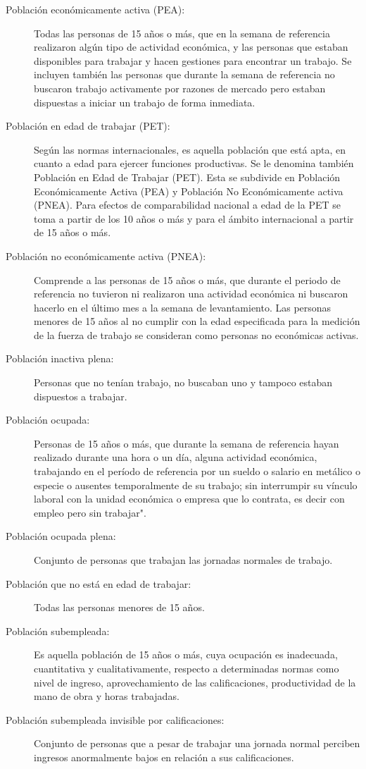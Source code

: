 \begin{description}
	\item[Población económicamente activa (PEA):] Todas las personas de 15 años o más, que en la semana de referencia realizaron algún tipo de actividad económica, y las personas que estaban disponibles para trabajar y hacen gestiones para encontrar un trabajo. Se incluyen también las personas que durante la semana de referencia no buscaron trabajo activamente por razones de mercado pero estaban dispuestas a iniciar un trabajo de forma inmediata.
	
	\item[Población en edad de trabajar (PET):] Según las normas internacionales, es aquella población que está apta, en cuanto a edad para ejercer funciones productivas. Se le denomina también Población en Edad de Trabajar (PET). Esta se subdivide en Población Económicamente Activa (PEA) y Población No Económicamente activa (PNEA). Para efectos de comparabilidad nacional a edad de la PET se toma a partir de los 10 años o más y para el ámbito internacional a partir de 15 años o más.
	\item[Población no económicamente activa (PNEA):] Comprende a las personas de 15 años o más, que durante el periodo de referencia no tuvieron ni realizaron una actividad económica ni buscaron hacerlo en el último mes a la semana de levantamiento. Las personas menores de 15 años al no cumplir con la edad especificada para la medición de la fuerza de trabajo se consideran como personas no económicas activas.
	\item[Población inactiva plena:] Personas que no tenían trabajo, no buscaban uno y tampoco estaban dispuestos a trabajar.
	
	\item[Población ocupada:] Personas de 15 años o más, que durante la semana de referencia hayan realizado durante una hora o un día, alguna actividad económica, trabajando en el período de referencia por un sueldo o salario en metálico o especie o ausentes temporalmente de su trabajo; sin interrumpir su vínculo laboral con la unidad económica o empresa que lo contrata, es decir con empleo pero sin trabajar".
	\item[Población ocupada plena:] Conjunto de personas que trabajan las jornadas normales de trabajo.
	
	\item[Población que no está en edad de trabajar:] Todas las personas menores de 15 años.
	
	\item[Población subempleada:] Es aquella población de 15 años o más, cuya ocupación es inadecuada, cuantitativa y cualitativamente, respecto a determinadas normas como nivel de ingreso, aprovechamiento de las calificaciones, productividad de la mano de obra y horas trabajadas.
	\item[Población subempleada invisible por calificaciones:] Conjunto de personas que a pesar de trabajar una jornada normal perciben ingresos anormalmente bajos en relación a sus calificaciones.
	

\end{description}
